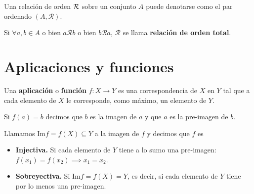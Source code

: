 \begin{notation}
    Una relación de orden $\mathcal{R}$ sobre un conjunto $A$ puede denotarse como el par ordenado $\left( A, \mathcal{R} \right) $.
\end{notation}

\begin{defi}
    Si $\forall a, b\in A$ o bien $a\mathcal{R} b$ o bien $b\mathcal{R} a$, $\mathcal{R}$ se llama \textbf{relación de orden total}.
\end{defi}

\section{Aplicaciones y funciones}
\begin{defi}
    Una \textbf{aplicación} o \textbf{función} $f:X\to Y$ es una correspondencia de $X$ en $Y$ tal que a cada elemento de $X$ le corresponde, como máximo, un elemento de $Y$.
\end{defi}

\begin{defi}
    Si $f\left( a \right) = b$ decimos que $b$ es la imagen de $a$ y que $a$ es la pre-imagen de $b$.
\end{defi}

\begin{defi}
    Llamamos Im$f = f\left( X \right) \subseteq Y$ a la imagen de $f$ y decimos que $f$ es
    \begin{itemize}
        \item\textbf{Injectiva.} Si cada elemento de $Y$ tiene a lo sumo una pre-imagen: $f\left( x_1 \right) = f\left( x_2 \right) \implies x_1 = x_2$.
        \item\textbf{Sobreyectiva.} Si Im$f = f\left( X \right) = Y$, es decir, si cada elemento de $Y$ tiene por lo menos una pre-imagen.
    \end{itemize}
\end{defi}



